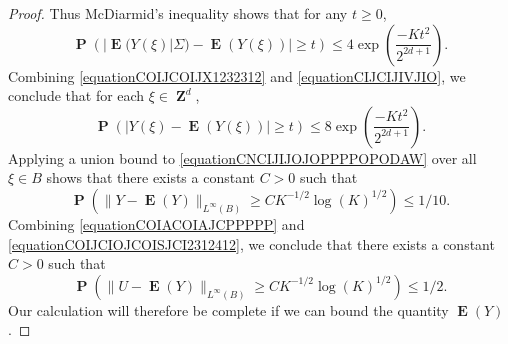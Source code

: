 \documentclass[12pt,reqno]{article}
\numberwithin{equation}{section}
\DeclareMathOperator{\ZZ}{\mathbf{Z}}
\numberwithin{theorem}{section}
\DeclareMathOperator{\EE}{\mathbf{E}}
\DeclareMathOperator{\PP}{\mathbf{P}}
\begin{document}
\begin{proof}
    Thus McDiarmid's inequality shows that for any $t \geq 0$,
    \begin{equation} \label{equationCIJCIJIVJIO}
        \PP \left( |\EE(Y(\xi)|\Sigma) - \EE(Y(\xi))| \geq t \right) \leq 4 \exp \left( \frac{-K t^2}{2^{2d+1}} \right).
    \end{equation}
    Combining \eqref{equationCOIJCOIJX1232312} and \eqref{equationCIJCIJIVJIO}, we conclude that for each $\xi \in \ZZ^d$,
    \begin{equation} \label{equationCNCIJIJOJOPPPPOPODAW}
        \PP \left( | Y(\xi) - \EE(Y(\xi)) | \geq t  \right) \leq 8 \exp \left( \frac{-K t^2}{2^{2d + 1}} \right).
    \end{equation}
    Applying a union bound to \eqref{equationCNCIJIJOJOPPPPOPODAW} over all $\xi \in B$ shows that there exists a constant $C > 0$ such that
    \begin{equation} \label{equationCOIJCIOJCOISJCI2312412}
        \PP \left( \| Y - \EE(Y) \|_{L^\infty(B)} \geq C K^{-1/2} \log(K)^{1/2} \right) \leq 1/10.
    \end{equation}
    Combining \eqref{equationCOIACOIAJCPPPPP} and \eqref{equationCOIJCIOJCOISJCI2312412}, we conclude that there exists a constant $C > 0$ such that
    \begin{equation} \label{equationOCIJCIOCJIO}
        \PP \left( \| U - \EE(Y) \|_{L^\infty(B)} \geq C K^{-1/2} \log(K)^{1/2} \right) \leq 1/2.
    \end{equation}
    Our calculation will therefore be complete if we can bound the quantity $\EE(Y)$.


\end{proof}
\end{document}
